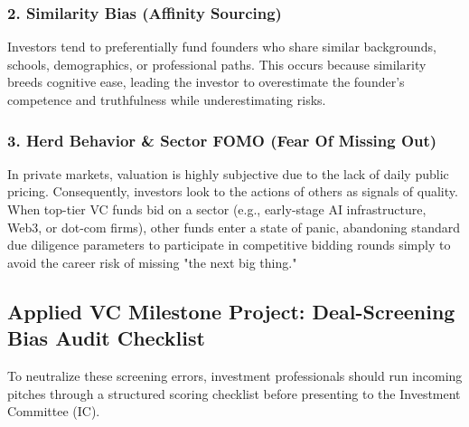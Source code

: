 \documentclass[11pt,a4paper]{article}
\begin{document}
\subsubsection{2. Similarity Bias (Affinity Sourcing)}
Investors tend to preferentially fund founders who share similar backgrounds, schools, demographics, or professional paths. This occurs because similarity breeds cognitive ease, leading the investor to overestimate the founder's competence and truthfulness while underestimating risks.

\subsubsection{3. Herd Behavior \& Sector FOMO (Fear Of Missing Out)}
In private markets, valuation is highly subjective due to the lack of daily public pricing. Consequently, investors look to the actions of others as signals of quality. When top-tier VC funds bid on a sector (e.g., early-stage AI infrastructure, Web3, or dot-com firms), other funds enter a state of panic, abandoning standard due diligence parameters to participate in competitive bidding rounds simply to avoid the career risk of missing "the next big thing."

\newpage
\subsection{Applied VC Milestone Project: Deal-Screening Bias Audit Checklist}
To neutralize these screening errors, investment professionals should run incoming pitches through a structured scoring checklist before presenting to the Investment Committee (IC).
\end{document}

